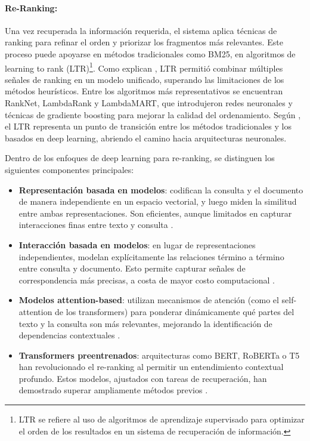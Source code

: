\paragraph{Re-Ranking:} Una vez recuperada la información requerida, el sistema aplica técnicas de ranking para refinar el orden y priorizar los fragmentos más relevantes.
Este proceso puede apoyarse en métodos tradicionales como BM25, en algoritmos de learning to rank (LTR)\footnote{ LTR se refiere al uso de algoritmos de aprendizaje supervisado para optimizar el orden de los resultados en un sistema de recuperación de información.}.
Como explican \textcite{bernard2025fate}, LTR permitió combinar múltiples señales de ranking en un modelo unificado, superando las limitaciones de los métodos
heurísticos. Entre los algoritmos más representativos se encuentran RankNet, LambdaRank y LambdaMART, que introdujeron redes neuronales y técnicas de gradiente 
boosting para mejorar la calidad del ordenamiento. Según \textcite{hambarde2023ir}, el LTR representa un punto de transición entre los métodos tradicionales y los basados en 
deep learning, abriendo el camino hacia arquitecturas neuronales.

Dentro de los enfoques de deep learning para re-ranking, se distinguen los siguientes componentes principales:

\begin{itemize}
    \item \textbf{Representación basada en modelos}: codifican la consulta y el documento de manera independiente en un espacio vectorial, y luego miden la similitud entre ambas representaciones. Son eficientes, aunque limitados en capturar interacciones finas entre texto y consulta \parencite{minaee2021}.
    
    \item \textbf{Interacción basada en modelos}: en lugar de representaciones independientes, modelan explícitamente las relaciones término a término entre consulta y documento. Esto permite capturar señales de correspondencia más precisas, a costa de mayor costo computacional \parencite{jiang2024textmatching}.
    
    \item \textbf{Modelos attention-based}: utilizan mecanismos de atención (como el self-attention de los transformers) para ponderar dinámicamente qué partes del texto y la consulta son más relevantes, mejorando la identificación de dependencias contextuales \parencite{hambarde2023ir}.
    
    \item \textbf{Transformers preentrenados}: arquitecturas como BERT, RoBERTa o T5 han revolucionado el re-ranking al permitir un entendimiento contextual profundo. Estos modelos, ajustados con tareas de recuperación, han demostrado superar ampliamente métodos previos \parencite{zhai2024llmIR}.
\end{itemize}

